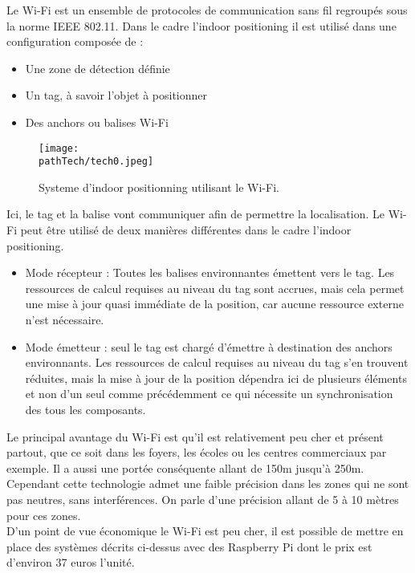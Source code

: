 Le Wi-Fi est un ensemble de protocoles de communication sans fil regroupés sous la norme IEEE 802.11.
Dans le cadre l'indoor positioning il est utilisé dans une configuration composée de :
\begin{itemize} 
\item Une zone de détection définie
\item Un tag, à savoir l'objet à positionner
\item Des anchors ou balises Wi-Fi 
\end{itemize}
\begin{figure}[H]
    \centering
    \texttt{[image: \\pathTech/tech0.jpeg]}
    \caption{Systeme d'indoor positionning utilisant le Wi-Fi.}
\end{figure}
Ici, le tag et la balise vont communiquer afin de permettre la localisation. 
Le Wi-Fi peut être utilisé de deux manières différentes dans le cadre l'indoor positioning.
\begin{itemize} 


    \item Mode récepteur : Toutes les balises environnantes émettent vers le tag. Les ressources de calcul
    requises au niveau du tag sont accrues, mais cela permet une mise à jour quasi immédiate de la position, car
    aucune ressource externe n’est nécessaire.
    \item Mode émetteur : seul le tag est chargé d’émettre à destination des anchors environnants. Les
    ressources de calcul requises au niveau du tag s'en trouvent réduites, mais la mise à jour de la position dépendra ici de plusieurs éléments et non d'un seul comme précédemment ce qui nécessite un synchronisation des tous les composants.
\end{itemize}
Le principal avantage du Wi-Fi est qu'il est relativement peu cher et présent partout, que ce soit dans les foyers, les écoles ou les centres commerciaux par exemple.
Il a aussi une portée conséquente allant de 150m jusqu'à 250m.
\medskip
\\
Cependant cette technologie admet une faible précision dans les zones qui ne sont pas neutres, sans interférences. On parle d'une précision allant de 5 à 10 mètres pour ces zones.
\medskip
\\
D'un point de vue économique le Wi-Fi est peu cher, il est possible de mettre en place des systèmes décrits ci-dessus avec des Raspberry Pi dont le prix est d'environ 37 euros l'unité.
